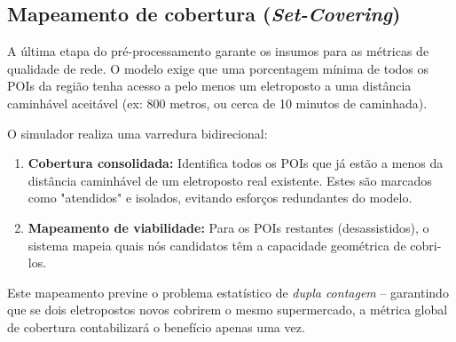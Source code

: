 \subsection{Mapeamento de cobertura (\textit{Set-Covering})}

A última etapa do pré-processamento garante os insumos para as métricas de qualidade de rede. O modelo exige que uma porcentagem mínima de todos os POIs da região tenha acesso a pelo menos um eletroposto a uma distância caminhável aceitável (ex: 800 metros, ou cerca de 10 minutos de caminhada).

O simulador realiza uma varredura bidirecional:
\begin{enumerate}
    \item \textbf{Cobertura consolidada:} Identifica todos os POIs que já estão a menos da distância caminhável de um eletroposto real existente. Estes são marcados como "atendidos" e isolados, evitando esforços redundantes do modelo.
    \item \textbf{Mapeamento de viabilidade:} Para os POIs restantes (desassistidos), o sistema mapeia quais nós candidatos têm a capacidade geométrica de cobri-los.
\end{enumerate}

Este mapeamento previne o problema estatístico de \textit{dupla contagem} -- garantindo que se dois eletropostos novos cobrirem o mesmo supermercado, a métrica global de cobertura contabilizará o benefício apenas uma vez.